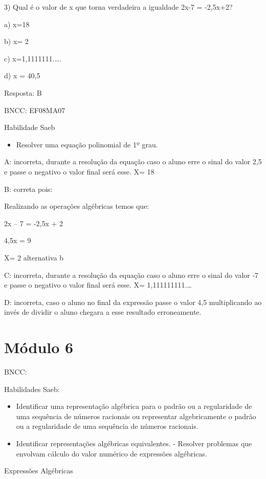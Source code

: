 3) Qual é o valor de x que torna verdadeira a igualdade 2x-7 = -2,5x+2?

a) x=18

b) x= 2

c) x=1,1111111.\ldots.

d) x = 40,5

Resposta: B

BNCC: EF08MA07

Habilidade Saeb

\begin{itemize}
\tightlist
\item
  Resolver uma equação polinomial de 1º grau.
\end{itemize}

A: incorreta, durante a resolução da equação caso o aluno erre o sinal
do valor 2,5 e passe o negativo o valor final será esse. X= 18

B: correta pois:

Realizando as operações algébricas temos que:

2x -- 7 = -2,5x + 2

4,5x = 9

X= 2 alternativa b

C: incorreta, durante a resolução da equação caso o aluno erre o sinal
do valor -7 e passe o negativo o valor final será esse. X=
1,111111111.\ldots{}

D: incorreta, caso o aluno no final da expressão passe o valor 4,5
multiplicando ao invés de dividir o aluno chegara a esse resultado
erroneamente.

\section{Módulo 6}

BNCC:

Habilidades Saeb:

\begin{itemize}
\item
  Identificar uma representação algébrica para o padrão ou a
  regularidade de uma sequência de números racionais ou representar
  algebricamente o padrão ou a regularidade de uma sequência de números
  racionais.
\item
  Identificar representações algébricas equivalentes. - Resolver
  problemas que envolvam cálculo do valor numérico de expressões
  algébricas.
\end{itemize}

Expressões Algébricas

